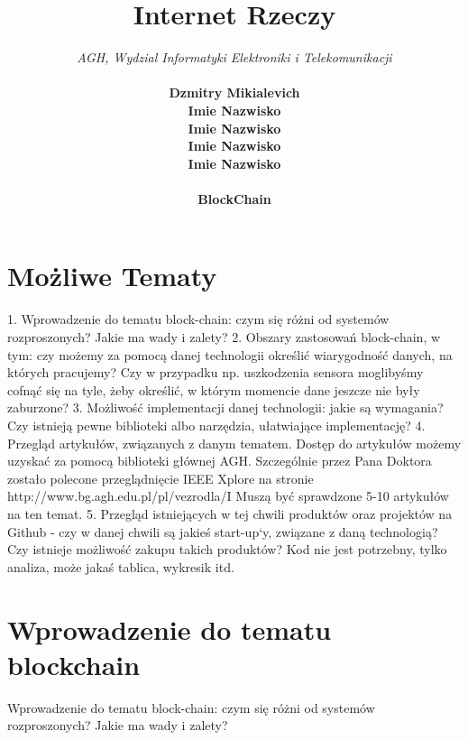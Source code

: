 \documentclass[12pt]{article}
\begin{document}
\title{Internet Rzeczy}
\author{
  \textit{AGH, Wydzial Informatyki Elektroniki i Telekomunikacji} \\ \\
  \textbf{Dzmitry Mikialevich}\\
  \textbf{Imie Nazwisko}\\
  \textbf{Imie Nazwisko}\\
  \textbf{Imie Nazwisko}\\
  \textbf{Imie Nazwisko}\\ \\
  \textbf{BlockChain}
}
\date{ }
\maketitle
\tableofcontents

\newpage

\section{Możliwe Tematy}
1. Wprowadzenie do tematu block-chain: czym się różni od systemów rozproszonych? Jakie ma wady i zalety?
2. Obszary zastosowań block-chain, w tym: czy możemy za pomocą danej technologii określić wiarygodność danych,
na których pracujemy? Czy w przypadku np. uszkodzenia sensora moglibyśmy cofnąć się na tyle, żeby określić, w którym momencie dane jeszcze nie były zaburzone?
3. Możliwość implementacji danej technologii: jakie są wymagania? Czy istnieją pewne biblioteki albo narzędzia, ułatwiające implementację?
4. Przegląd artykułów, związanych z danym tematem. Dostęp do artykułów możemy uzyskać za pomocą biblioteki głównej AGH. Szczególnie przez Pana Doktora zostało polecone przeglądnięcie IEEE Xplore na stronie http://www.bg.agh.edu.pl/pl/vezrodla/I
Muszą być sprawdzone 5-10 artykułów na ten temat.
5. Przegląd istniejących w tej chwili produktów oraz projektów na Github - czy w danej chwili są jakieś start-up`y, związane z daną technologią? Czy istnieje możliwość zakupu takich produktów? Kod nie jest potrzebny, tylko analiza, może jakaś tablica, wykresik itd.

\section{Wprowadzenie do tematu blockchain}

Wprowadzenie do tematu block-chain: czym się różni od systemów rozproszonych? Jakie ma wady i zalety?
\end{document}
